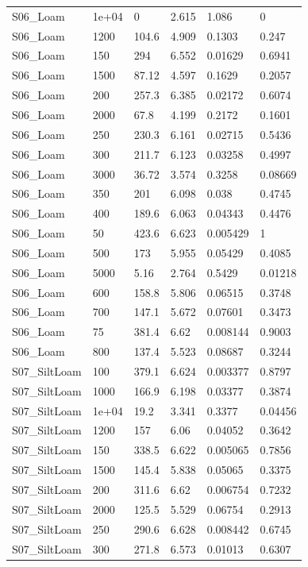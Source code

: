 {\begin{longtable}
{}S06\_Loam & 1e+04 & 0 & 2.615 & 1.086 & 0\\
{}S06\_Loam & 1200 & 104.6 & 4.909 & 0.1303 & 0.247\\
{}S06\_Loam & 150 & 294 & 6.552 & 0.01629 & 0.6941\\
{}S06\_Loam & 1500 & 87.12 & 4.597 & 0.1629 & 0.2057\\
{}S06\_Loam & 200 & 257.3 & 6.385 & 0.02172 & 0.6074\\
{}S06\_Loam & 2000 & 67.8 & 4.199 & 0.2172 & 0.1601\\
{}S06\_Loam & 250 & 230.3 & 6.161 & 0.02715 & 0.5436\\
{}S06\_Loam & 300 & 211.7 & 6.123 & 0.03258 & 0.4997\\
{}S06\_Loam & 3000 & 36.72 & 3.574 & 0.3258 & 0.08669\\
{}S06\_Loam & 350 & 201 & 6.098 & 0.038 & 0.4745\\
{}S06\_Loam & 400 & 189.6 & 6.063 & 0.04343 & 0.4476\\
{}S06\_Loam & 50 & 423.6 & 6.623 & 0.005429 & 1\\
{}S06\_Loam & 500 & 173 & 5.955 & 0.05429 & 0.4085\\
{}S06\_Loam & 5000 & 5.16 & 2.764 & 0.5429 & 0.01218\\
{}S06\_Loam & 600 & 158.8 & 5.806 & 0.06515 & 0.3748\\
{}S06\_Loam & 700 & 147.1 & 5.672 & 0.07601 & 0.3473\\
{}S06\_Loam & 75 & 381.4 & 6.62 & 0.008144 & 0.9003\\
{}S06\_Loam & 800 & 137.4 & 5.523 & 0.08687 & 0.3244\\
{}S07\_SiltLoam & 100 & 379.1 & 6.624 & 0.003377 & 0.8797\\
{}S07\_SiltLoam & 1000 & 166.9 & 6.198 & 0.03377 & 0.3874\\
{}S07\_SiltLoam & 1e+04 & 19.2 & 3.341 & 0.3377 & 0.04456\\
{}S07\_SiltLoam & 1200 & 157 & 6.06 & 0.04052 & 0.3642\\
{}S07\_SiltLoam & 150 & 338.5 & 6.622 & 0.005065 & 0.7856\\
{}S07\_SiltLoam & 1500 & 145.4 & 5.838 & 0.05065 & 0.3375\\
{}S07\_SiltLoam & 200 & 311.6 & 6.62 & 0.006754 & 0.7232\\
{}S07\_SiltLoam & 2000 & 125.5 & 5.529 & 0.06754 & 0.2913\\
{}S07\_SiltLoam & 250 & 290.6 & 6.628 & 0.008442 & 0.6745\\
{}S07\_SiltLoam & 300 & 271.8 & 6.573 & 0.01013 & 0.6307\\

\end{longtable}}
